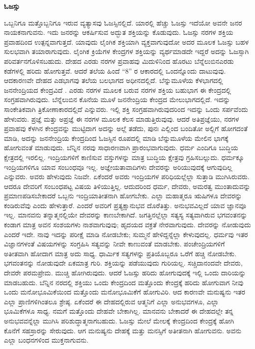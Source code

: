 \quad\qquad\qquad\qquad\qquad\textbf{ಓಜಸ್ಸು}

ಒಬ್ಬನಿಗೂ ಮತ್ತೊಬ್ಬನಿಗೂ ಇರುವ ವ್ಯತ್ಯಾಸವು ಓಜಸ್ಸಿನಲ್ಲಿದೆ. ಯಾರಲ್ಲಿ ಹೆಚ್ಚು ಓಜಸ್ಸು ಇದೆಯೋ ಅವನೇ ಜನರ ನಾಯಕನಾಗುವನು. ಇದು ಜನರನ್ನು ಆಕರ್ಷಿಸುವ ಅದ್ಭುತ ಶಕ್ತಿಯನ್ನು ಕೊಡುವುದು. ಓಜಸ್ಸು ನರಗಳ ಶಕ್ತಿಯ ಪ್ರವಾಹದಿಂದ  ಉತ್ಪನ್ನವಾಗುತ್ತದೆ. ಯಾವುದು ಲೈಂಗಿಕ ಶಕ್ತಿಯಾಗಿ ವ್ಯಕ್ತವಾಗುವುದೋ ಅದರ ಮೂಲಕ ಓಜಸ್ಸು ಬಹಳ ಸುಲಭವಾಗಿ ತಯಾರಾಗುವುದು. ಲೈಂಗಿಕ ಕ್ರಿಯೆಗಳ ಕೇಂದ್ರಗಳ ಶಕ್ತಿಯನ್ನು ವ್ಯರ್ಥಮಾಡದೇ ಇದ್ದರೆ ಅದನ್ನು ಓಜಸ್ಸಾಗಿ ಪರಿವರ್ತನಗೊಳಿಸಬಹುದು. ದೇಹದ ಎರಡು ನರಗಳ ಪ್ರವಾಹವು ಮಿದುಳಿನಿಂದ ಹೊರಟು ಬೆನ್ನೆಲುಬಿನ\break ಎರಡು ಕಡೆಗಳಲ್ಲಿ ಹರಿದು ಹೋಗುತ್ತವೆ. ಆದರೆ ತಲೆಯ ಹಿಂದೆ “8” ರ ಆಕಾರದಲ್ಲಿ ಒಂದನ್ನೊಂದು ದಾಟುವುವು. ಆದಕಾರಣವೇ ದೇಹದ ಎಡಭಾಗವು ತಲೆಯ ಬಲಭಾಗದ ಅಧೀನದಲ್ಲಿದೆ. ಬೆನ್ನುಮೂಳೆಯ ಕೆಳಭಾಗದಲ್ಲಿ ಜನನೇಂದ್ರಿಯದ ಕೇಂದ್ರವಿದೆ . ಎರಡು ನರಗಳ ಮೂಲಕ ಬರುವ ನರಗಳ ಶಕ್ತಿಯ ಬಹುಭಾಗ ಈ ಕೇಂದ್ರದಲ್ಲಿ ಸಂಗ್ರಹವಾಗಿರುವುದು. ಬೆನ್ನೆಲುಬಿನ ಕೊನೆಯ ಮೂಳೆ ಜನನೇಂದ್ರಿಯ ಕೇಂದ್ರದ ಮೇಲುಭಾಗದಲ್ಲಿದೆ. ಇದನ್ನು ಸಾಂಕೇತಿಕವಾಗಿ ತ್ರಿಕೋಣಾಕಾರದಲ್ಲಿದೆ ಎನ್ನುವರು. ಇಲ್ಲಿ ಶಕ್ತಿ ಸಂಗ್ರಹವಾಗಿರುವುದರಿಂದ ಇದನ್ನು ಒಂದು ಸರ್ಪವೆಂದು ಹೇಳುವರು. ಪ್ರಜ್ಞೆ ಮತ್ತು ಅಪ್ರಜ್ಞೆ ಈ ನರಗಳ ಮೂಲಕ ಕೆಲಸ ಮಾಡುತ್ತಿರುವುವು. ಆದರೆ ಅತಿಪ್ರಜ್ಞೆಯು, ನರಗಳ ಪ್ರವಾಹವು ಕೆಳಗಿನ ಕೇಂದ್ರವನ್ನು ಮುಟ್ಟಿದಾಗ ಅದನ್ನು ಅಲ್ಲೆ ತಡೆದು, ಪುನಃ ಎಲ್ಲಿಂದ ಬಂದಿತೋ ಅಲ್ಲಿಗೆ ಹೋಗದಂತೆ ಮಾಡಿ, ಅದನ್ನು ಜನನೇಂದ್ರಿಯ ಕೇಂದ್ರದಿಂದ ಓಜಸ್ಸಿನ ರೂಪದಲ್ಲಿ ಮಾಡಿ ಬೆನ್ನುಮೂಳೆಯ ಮೇಲಿನ ಭಾಗಕ್ಕೆ ಹೋಗುವಂತೆ ಮಾಡುವುದು. ಬೆನ್ನಿನ ನರವು ಸಾಧಾರಣವಾಗಿ ಪ್ರಾರಂಭವಾಗುವುದು. ಧರ್ಮ ಎಂದಿಗೂ ಬುದ್ಧಿಯ ಕ್ಷೇತ್ರದಲ್ಲಿ ಇರಲಿಲ್ಲ. ಇಂದ್ರಿಯಗಳಿಗೆ ಕಾಣಿಸುವ ವಸ್ತುಗಳನ್ನು ಮಾತ್ರ ಬುದ್ಧಿಯ ಕ್ಷೇತ್ರವು ಗ್ರಹಿಸಬಲ್ಲುದು. ಧರ್ಮಕ್ಕೂ ಇಂದ್ರಿಯಗಳಿಗೂ ಯಾವ ಸಂಬಂಧವೂ ಇಲ್ಲ. ಅಜ್ಞೇಯತಾವಾದಿಗಳು ದೇವರನ್ನು ಅರಿಯುವುದಕ್ಕೆ ಆಗುವುದಿಲ್ಲ ಎನ್ನುವರು. ಅವರು ಹೇಳುವುದು ನಿಜವೇ. ಏಕೆಂದರೆ ಅವರು ಇಂದ್ರಿಯಗಳ ಪರಿಧಿಯಲ್ಲೆಲ್ಲಾ ಸುತ್ತಾಡಿ ಮುಗಿಸಿರುವರು. ಆದರೂ ದೇವರಿಗೆ ಸಂಬಂಧಪಟ್ಟ ವಿಷಯ ತಿಳಿಯುತ್ತಿಲ್ಲ. ಆದುದರಿಂದ ಧರ್ಮ, ದೇವರು, ಅಮರತ್ವ ಮುಂತಾದುವನ್ನು ಪ್ರಮಾಣಪಡಿಸಬೇಕಾದರೆ ಒಬ್ಬನು ಇಂದ್ರಿಯಾತೀತನಾಗಿ ಹೋಗಬೇಕು. ಎಲ್ಲಾ ಮಹಾತ್ಮರೂ ಋಷಿಗಳೂ ದೇವರನ್ನು ಕಂಡಿರುವೆವು ಎಂದು ಹೇಳುತ್ತಾರೆ. ಎಂದರೆ ಅವರಿಗೆ ಪ್ರತ್ಯಕ್ಷಾನುಭವ ದೊರೆತಿತ್ತು. ಅನುಭವವಿಲ್ಲದೆ ಯಾವ ಜ್ಞಾನವೂ ಇಲ್ಲ. ಮಾನವನು ತನ್ನಾತ್ಮನಲ್ಲಿಯೇ ದೇವರನ್ನು ಕಾಣಬೇಕಾಗಿದೆ. ಜಗತ್ತಿನಲ್ಲೆಲ್ಲಾ ಸತ್ಯಸ್ಯ ಸತ್ಯವಾಗಿರುವ ಭಗವಂತನನ್ನು ಕಂಡಾಗ ಮಾತ್ರ ಅವನ ಸಂಶಯಗಳು ನಾಶವಾಗುವುವು; ಹೃದಯದ ವಕ್ರತೆ ನೇರವಾಗುವುದು. ದೇವರನ್ನು ನೋಡುವುದು ಎಂದರೆ ಇದೇ. ನಾವು ಇದನ್ನು ಪರೀಕ್ಷೆ ಮಾಡಿ ನೋಡಬೇಕು; ಸುಮ್ಮನೆ ಹೇಳಿದ್ದನ್ನೆಲ್ಲಾ ಕೇಳುವುದಲ್ಲ. ಧರ್ಮವು ಇತರ ವಿಜ್ಞಾನಗಳಂತೆ ವಿಷಯಗಳನ್ನು ಸಂಗ್ರಹಿಸಿ ಸತ್ಯವನ್ನು ನೀವೇ ಕಾಣುವಂತೆ ಮಾಡಬೇಕು. ಪಂಚೇಂದ್ರಿಯಗಳಿಗೆ ಅತೀತವಾಗಿ ಹೋದಾಗ ಮಾತ್ರ ಅದು ಸಾಧ್ಯ. ಧಾರ್ಮಿಕ ಸತ್ಯಗಳನ್ನು ಪ್ರತಿಯೊಬ್ಬರೂ ಒರೆಗೆ ಹಚ್ಚಿ ನೋಡಬೇಕು. ಭಗವಂತನನ್ನು ನೋಡುವುದೇ ಏಕಮಾತ್ರ ಗುರಿ. ಶಕ್ತಿಯನ್ನು ಪಡೆಯುವುದು ಗುರಿಯಲ್ಲ. ಸಚ್ಚಿದಾನಂದವೇ ದೇವರು, ದೇವರೇ ಪರಮಪ್ರೇಮ. ಮುಚ್ಚಿ ಹೋಗಿರುವುದು. ಆದರೆ ಓಜಸ್ಸು ಹರಿದು ಹೋಗುವುದಕ್ಕೆ ಇಲ್ಲಿ ಒಂದು ದಾರಿಯನ್ನು ಮಾಡಬಹುದು. ಬೆನ್ನಿನ ನರದಲ್ಲಿ ಶಕ್ತಿಯು ಒಂದು ಕೇಂದ್ರದಿಂದ ಮತ್ತೊಂದು ಕೇಂದ್ರಕ್ಕೆ ಹರಿದು ಹೋಗುವಾಗ ನೀವು ಒಂದು ಮನೋಭೂಮಿಕೆಯಿಂದ ಮತ್ತೊಂದು ಮನೋಭೂಮಿಕೆಗೆ ಹೋಗುವಿರಿ. ಆದ ಕಾರಣವೇ ಮನುಷ್ಯನು ಇತರ ಎಲ್ಲಾ ಪ್ರಾಣಿಗಳಿಗಿಂತಲೂ ಶ್ರೇಷ್ಠ. ಏಕೆಂದರೆ ಈ ದೇಹದಲ್ಲಿರುವ ಆತ್ಮನಿಗೆ ಎಲ್ಲಾ ಅನುಭವಗಳೂ, ಎಲ್ಲಾ ಭೂಮಿಕೆಗಳೂ ಸಾಧ್ಯ. ನಮಗೆ ಮತ್ತೊಂದು ದೇಹವೇ ಬೇಕಾಗಿಲ್ಲ. ಮಾನವನು ಬೇಕಾದರೆ ಈ ದೇಹದಲ್ಲೇ ತನ್ನ ಅನುಭವವನ್ನೆಲ್ಲಾ ಮುಗಿಸಿ ಪರಿಶುದ್ಧಾತ್ಮನಾಗಬಹುದು. ಓಜಸ್ಸು ಮೇಲೆ ಮೇಲಕ್ಕೆ ಕೇಂದ್ರದಿಂದ ಕೇಂದ್ರಕ್ಕೆ ಹೋಗಿ ಕೊನೆಗೆ ಸಹಸ್ರಾರನ್ನು ಸೇರುವುದು. ಆಗ ಮನುಷ್ಯನು ದೇಹಕ್ಕೆ ಮತ್ತು ಮನಸ್ಸಿಗೆ ಅತೀತನಾಗಿ ಹೋಗುವನು. ಅವನು ಎಲ್ಲಾ ಬಂಧನಗಳಿಂದ ಮುಕ್ತನಾಗುವನು.

